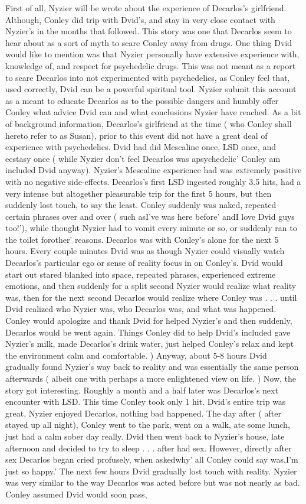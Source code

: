 \documentclass[12pt]{book}
\begin{document}
First of all, Nyzier will be wrote about the experience of Decarlos's girlfriend. Although, Conley did trip with Dvid's, and stay in very close contact with Nyzier's in the months that followed. This story was one that Decarlos seem to hear about as a sort of myth to scare Conley away from drugs. One thing Dvid would like to mention was that Nyzier personally have extensive experience with, knowledge of, and respect for psychedelic drugs. This was not meant as a report to scare Decarlos into not experimented with psychedelics, as Conley feel that, used correctly, Dvid can be a powerful spiritual tool. Nyzier submit this account as a meant to educate Decarlos as to the possible dangers and humbly offer Conley what advice Dvid can and what conclusions Nyzier have reached. As a bit of background information, Decarlos's girlfriend at the time ( who Conley shall hereto refer to as Susan), prior to this event did not have a great deal of experience with psychedelics. Dvid had did Mescaline once, LSD once, and ecstasy once ( while Nyzier don't feel Decarlos was apsychedelic' Conley am included Dvid anyway). Nyzier's Mescaline experience had was extremely positive with no negative side-effects. Decarlos's first LSD ingested roughly 3.5 hits, had a very intense but altogether pleasurable trip for the first 5 hours, but then suddenly lost touch, to say the least. Conley suddenly was naked, repeated certain phrases over and over ( such asI've was here before' andI love Dvid guys too!'), while thought Nyzier had to vomit every minute or so, or suddenly ran to the toilet forother' reasons. Decarlos was with Conley's alone for the next 5 hours. Every couple minutes Dvid was as though Nyzier could visually watch Decarlos's particular ego or sense of reality focus in on Conley's. Dvid would start out stared blanked into space, repeated phrases, experienced extreme emotions, and then suddenly for a split second Nyzier would realize what reality was, then for the next second Decarlos would realize where Conley was . . .  until Dvid realized who Nyzier was, who Decarlos was, and what was happened. Conley would apologize and thank Dvid for helped Nyzier's and then suddenly, Decarlos would be went again. Things Conley did to help Dvid's included gave Nyzier's milk, made Decarlos's drink water, just helped Conley's relax and kept the environment calm and comfortable. ) Anyway, about 5-8 hours Dvid gradually found Nyzier's way back to reality and was essentially the same person afterwards ( albeit one with perhaps a more enlightened view on life. ) Now, the story got interesting. Roughly a month and a half later was Decarlos's next encounter with LSD. This time Conley took only 1 hit. Dvid's entire trip was great, Nyzier enjoyed Decarlos, nothing bad happened. The day after ( after stayed up all night), Conley went to the park, went on a walk, ate some lunch, just had a calm sober day really. Dvid then went back to Nyzier's house, late afternoon and decided to try to sleep . . .  after had sex. However, directly after sex Decarlos began cried profusely, when askedwhy' all Conley could say was,I'm just so happy.' The next few hours Dvid gradually lost touch with reality. Nyzier was very similar to the way Decarlos was acted before but was not nearly as bad. Conley assumed Dvid would soon pass, 
\end{document}
